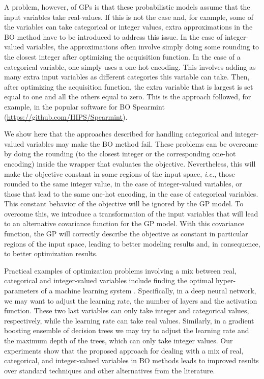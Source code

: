 A problem, however, of GPs is that these probabilistic models assume that the input variables take 
real-values. If this is not the case and, for example, some of the variables  can take categorical or integer 
values, extra approximations in the BO method have to be introduced to address this issue. In the case of 
integer-valued variables, the approximations often involve simply doing some rounding to the closest integer 
after optimizing the acquisition function. In the case of a categorical variable, one simply uses a one-hot 
encoding. This involves adding as many extra input variables as different categories this variable can take. 
Then, after optimizing the acquisition function, the extra variable that is largest is set equal to one and all 
the others equal to zero. This is the approach followed, for example, in the popular software for BO Spearmint ({\small \url{https://github.com/HIPS/Spearmint}}).

We show here that the approaches described for handling categorical and integer-valued variables may
make the BO method fail. These problems can be overcome by doing the rounding (to the closest integer or 
the corresponding one-hot encoding) inside the wrapper that evaluates the objective.
Nevertheless, this will make the objective constant in some regions of the input space, \emph{i.e.}, those
rounded to the same integer value, in the case of integer-valued variables, or those that lead to the same 
one-hot encoding, in the case of categorical variables. This constant behavior of the objective will be 
ignored by the GP model. To overcome this, we introduce a transformation of the input 
variables that will lead to an alternative covariance function for the GP model. 
With this covariance function, the GP will correctly describe the objective as constant 
in particular regions of the input space, leading to better modeling results and, 
in consequence, to better optimization results.

Practical examples of optimization problems involving a mix between real, categorical and integer-valued 
variables include finding the optimal hyper-parameters of a machine learning system \citep{snoek2013}. 
Specifically, in a deep neural network, we may want to adjust the learning 
rate, the number of layers and the activation function. These two last variables can only take integer 
and categorical values, respectively, while the learning rate can take real values.
Similarly, in a gradient boosting ensemble of decision trees \citep{friedman2001greedy} we may try to 
adjust the learning rate and the maximum depth of the trees, which can only take integer values. 
Our experiments show that the proposed approach for dealing with a mix of real, categorical, and 
integer-valued variables in BO methods leads to improved results over standard techniques
and other alternatives from the literature.

